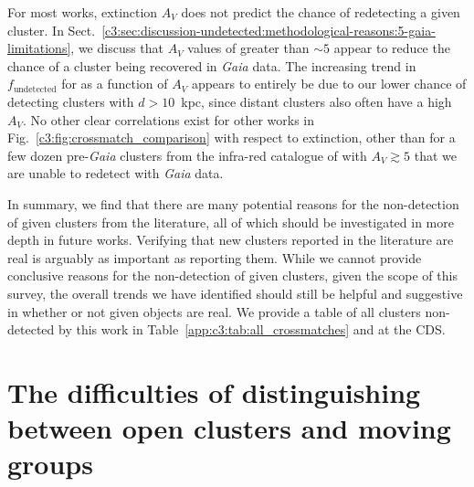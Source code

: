 For most works, extinction $A_V$ does not predict the chance of redetecting a given cluster. In Sect.~\ref{c3:sec:discussion-undetected:methodological-reasons:5-gaia-limitations}, we discuss that $A_V$ values of greater than $\sim5$ appear to reduce the chance of a cluster being recovered in \emph{Gaia} data. The increasing trend in $f_\text{undetected}$ for \cite{cantat-gaudin_clusters_2020} as a function of $A_V$ appears to entirely be due to our lower chance of detecting clusters with $d>10$~kpc, since distant clusters also often have a high $A_V$. No other clear correlations exist for other works in Fig.~\ref{c3:fig:crossmatch_comparison} with respect to extinction, other than for a few dozen pre-\emph{Gaia} clusters from the infra-red catalogue of \cite{kharchenko_global_2013} with $A_V \gtrsim 5$ that we are unable to redetect with \emph{Gaia} data.

In summary, we find that there are many potential reasons for the non-detection of given clusters from the literature, all of which should be investigated in more depth in future works. Verifying that new clusters reported in the literature are real is arguably as important as reporting them. While we cannot provide conclusive reasons for the non-detection of given clusters, given the scope of this survey, the overall trends we have identified should still be helpful and suggestive in whether or not given objects are real. We provide a table of all clusters non-detected by this work in Table~\ref{app:c3:tab:all_crossmatches} and at the CDS.




\section{The difficulties of distinguishing between open clusters and moving groups}\label{c3:sec:discussion-moving_groups}

